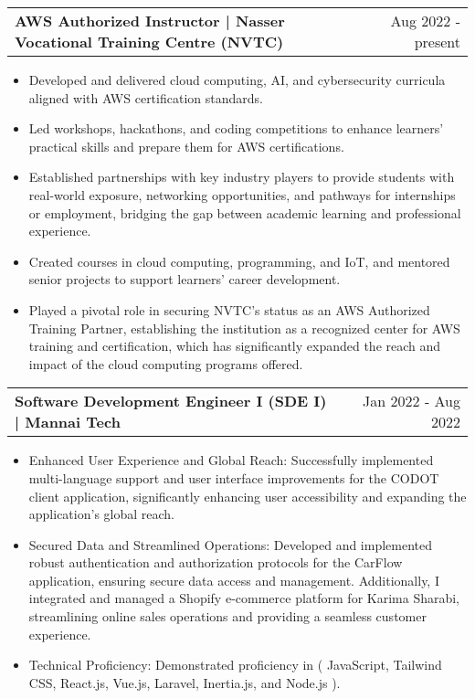 \documentclass[a4paper,11pt]{article}
\makeatletter
\newenvironment{joblong}[2]
    {
    \begin{tabularx}{\linewidth}{@{}l X r@{}}
    \textbf{#1} & \hfill &  #2 \\[3.75pt]
    \end{tabularx}
    \begin{minipage}[t]{\linewidth}
    \begin{itemize}[nosep,after=\strut, leftmargin=1em, itemsep=3pt,label=--]
    }
    {
    \end{itemize}
    \end{minipage}    
    }
\makeatother
\begin{document}
\begin{joblong}{AWS Authorized Instructor | Nasser Vocational Training Centre (NVTC)}{Aug 2022 - present}
\item Developed and delivered cloud computing, AI, and cybersecurity curricula aligned with AWS certification standards.
\item Led workshops, hackathons, and coding competitions to enhance learners' practical skills and prepare them for AWS certifications.
\item Established partnerships with key industry players to provide students with real-world exposure, networking opportunities, and pathways for internships or employment, bridging the gap between academic learning and professional experience.
\item Created courses in cloud computing, programming, and IoT, and mentored senior projects to support learners' career development.
\item Played a pivotal role in securing NVTC’s status as an AWS Authorized Training Partner, establishing the institution as a recognized center for AWS training and certification, which has significantly expanded the reach and impact of the cloud computing programs offered.

\end{joblong}

\begin{joblong}{Software Development Engineer I (SDE I) | Mannai Tech}{Jan 2022 - Aug 2022}
    \item Enhanced User Experience and Global Reach: Successfully implemented multi-language support and user interface improvements for the CODOT client application, significantly enhancing user accessibility and expanding the application's global reach.
    \item Secured Data and Streamlined Operations: Developed and implemented robust authentication and authorization protocols for the CarFlow application, ensuring secure data access and management. Additionally, I integrated and managed a Shopify e-commerce platform for Karima Sharabi, streamlining online sales operations and providing a seamless customer experience.
    \item Technical Proficiency: Demonstrated proficiency in ( JavaScript, Tailwind CSS, React.js, Vue.js, Laravel, Inertia.js, and Node.js ).
    
\end{joblong}
\end{document}
